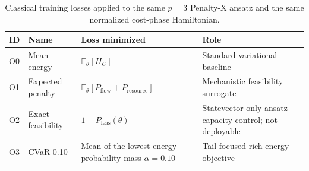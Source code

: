 
\begin{table}[t]
\centering
\caption{Classical training losses applied to the same $p=3$ Penalty-X ansatz and the same normalized cost-phase Hamiltonian.}
\label{tab:objectives}
\small
\begin{tabularx}{\textwidth}{@{}lllX@{}}
\toprule
ID & Name & Loss minimized & Role \\
\midrule
O0 & Mean energy & $\mathbb{E}_{\theta}[H_C]$ & Standard variational baseline \\
O1 & Expected penalty & $\mathbb{E}_{\theta}[P_{\mathrm{flow}}+P_{\mathrm{resource}}]$ & Mechanistic feasibility surrogate \\
O2 & Exact feasibility & $1-P_{\mathrm{feas}}(\theta)$ & Statevector-only ansatz-capacity control; not deployable \\
O3 & CVaR-0.10 & Mean of the lowest-energy probability mass $\alpha=0.10$ & Tail-focused rich-energy objective \\
\bottomrule
\end{tabularx}
\end{table}

